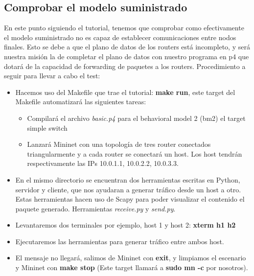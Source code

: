 \subsection{Comprobar el modelo suministrado}
En este punto siguiendo el tutorial, tenemos que comprobar como efectivamente el modelo suministrado no es capaz de establecer comunicaciones entre nodos finales. Esto se debe a que el plano de datos de los routers está incompleto, y será nuestra misión la de completar el plano de datos con nuestro programa en p4 que dotará de la capacidad de forwarding de paquetes a los routers. \newline
\newline
Procedimiento a seguir para llevar a cabo el test:
\begin{itemize}
    \item Hacemos uso del Makefile que trae el tutorial: \textbf{make run}, este target del Makefile automatizará las siguientes tareas:
    \begin{itemize}
        \item Compilará el archivo \textit{basic.p4} para el behavioral model 2 (bm2) el target simple switch
        \item Lanzará Mininet con una topología de tres router conectados triangularmente y a cada router se conectará un host. Los host tendrán respectivamente las IPs 10.0.1.1, 10.0.2.2, 10.0.3.3. 
    \end{itemize}
    \item En el mismo directorio se encuentran dos herramientas escritas en Python, servidor y cliente, que nos ayudaran a generar tráfico desde un host a otro. Estas herramientas hacen uso de Scapy para poder visualizar el contenido el paquete generado. Herramientas \textit{receive.py} y \textit{send.py}. 
    \item Levantaremos dos terminales por ejemplo, host 1 y host 2: \textbf{xterm h1 h2}
    \item Ejecutaremos las herramientas para generar tráfico entre ambos host.
    \item El mensaje no llegará, salimos de Mininet con \textbf{exit}, y limpiamos el escenario y Mininet con \textbf{make stop} (Este target llamará a \textbf{sudo mn -c} por nosotros).
\end{itemize}


